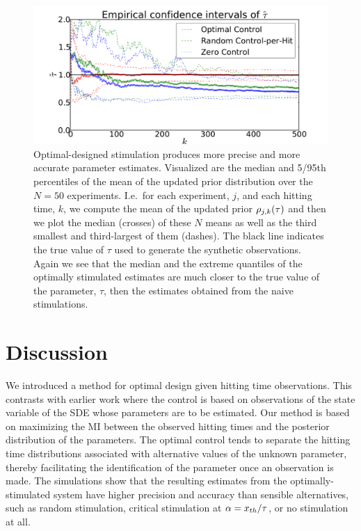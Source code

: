 \begin{figure}[htp]
\begin{center}
  \includegraphics[width=\textwidth]{Figs/HTOnlineEstimator/online_updated_prior_quantiles_mean_per_experiment.pdf}
  \caption[Quantiles of the Mean Estimates]{Optimal-designed stimulation produces more precise and more accurate
  parameter estimates. 
  Visualized are the median and
  5/95th percentiles of the mean of the updated prior
  distribution over the $N=50$ experiments. I.e.\ for each experiment, $j$, and
  each hitting time, $k$, we compute the mean of the updated prior $\rho_{j,k}({ \tau })$
  and then we plot the median (crosses) of these $N$ means as well as the third
  smallest and third-largest of them (dashes). 
  The black line indicates the true value of $\tau$ used to generate the
  synthetic observations. 
  Again we see that the median and the extreme quantiles of the
  optimally stimulated estimates are much closer to the true value of the parameter, $\tau$, then the estimates obtained from the naive stimulations.}
  \label{fig:online_optimization_quantiles_belief_evolution}
\end{center}
\end{figure}


\section{Discussion}
\label{sec:discussion}
We introduced a method for optimal design given hitting time observations. This
contrasts with earlier work where the control is based on observations of the
state variable of the SDE whose parameters are to
be estimated. Our method is based on maximizing the MI between
the observed hitting times and the posterior distribution of the parameters. The
optimal control tends to separate the hitting time distributions associated with
alternative values of the unknown parameter, thereby facilitating the
identification of the parameter once an observation is made. The simulations
show that the resulting estimates from the optimally-stimulated system have
higher precision and accuracy than sensible alternatives, such as random
stimulation, critical stimulation at $\alpha={ x_{th} }/{ \tau }$, or no stimulation at
all.

